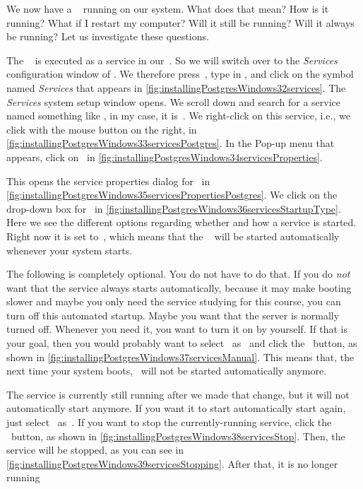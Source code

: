 We now have a \postgresql\   running on our system.
What does that mean?
How is it running?
What if I restart my computer?
Will it still be running?
Will it always be running?
Let us investigate these questions.

The \postgresql\  is executed as a service in our~.
So we will switch over to the \emph{Services} configuration window of \microsoftWindows.
We therefore press~\keys{\OSwin}, type in , and click on the  symbol named \emph{Services} that appears in \cref{fig:installingPostgresWindows32services}.
The \emph{Services} system setup window opens.
We scroll down and search for a service named something like \postgresql, in my case, it is~.
We right-click on this service, i.e., we click with the mouse button on the right, in \cref{fig:installingPostgresWindows33servicesPostgres}.
In the Pop-up menu that appears, click on~ in \cref{fig:installingPostgresWindows34servicesProperties}.

This opens the service properties dialog for \postgresql\ in \cref{fig:installingPostgresWindows35servicesPropertiesPostgres}.
We click on the drop-down box for~ in \cref{fig:installingPostgresWindows36servicesStartupType}.
Here we see the different options regarding whether and how a service is started.
Right now it is set to~, which means that the \postgresql\   will be started automatically whenever your system starts.

The following is completely optional.
You do not have to do that.
If you do \emph{not} want that the service always starts automatically, because it may make booting slower and maybe you only need the service studying for this course, you can turn off this automated startup.
Maybe you want that the server is normally turned off.
Whenever you need it, you want to turn it on by yourself.
If that is your goal, then you would probably want to select~ as~ and click the ~button, as shown in \cref{fig:installingPostgresWindows37servicesManual}.
This means that, the next time your system boots, \postgresql\ will not be started automatically anymore.

The service is currently still running after we made that change, but it will not automatically start anymore.
If you want it to start automatically start again, just select~ as~. %
If you want to stop the currently-running service, click the ~button, as shown in \cref{fig:installingPostgresWindows38servicesStop}.
Then, the service will be stopped, as you can see in \cref{fig:installingPostgresWindows39servicesStopping}.
After that, it is no longer running

